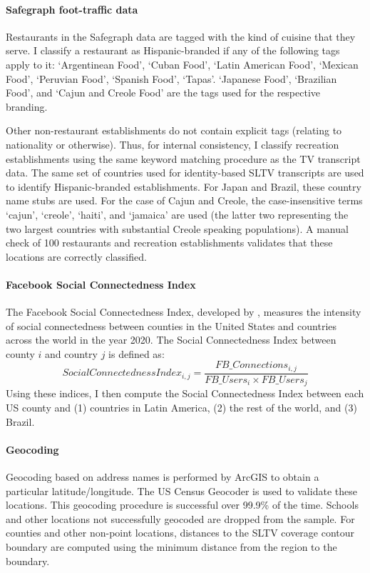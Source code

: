 \documentclass[11pt]{article}
\begin{document}
\paragraph{Safegraph foot-traffic data} 
Restaurants in the Safegraph data are tagged with the kind of cuisine that they serve. I classify a restaurant as Hispanic-branded if any of the following tags apply to it: `Argentinean Food', `Cuban Food', `Latin American Food', `Mexican Food', `Peruvian Food', `Spanish Food', `Tapas'. `Japanese Food', `Brazilian Food', and `Cajun and Creole Food' are the tags used for the respective branding.

Other non-restaurant establishments do not contain explicit tags (relating to nationality or otherwise). Thus, for internal consistency, I classify recreation establishments using the same keyword matching procedure as the TV transcript data. The same set of countries used for identity-based SLTV transcripts are used to identify Hispanic-branded establishments. For Japan and Brazil, these country name stubs are used. For the case of Cajun and Creole, the case-insensitive terms `cajun', `creole', `haiti', and `jamaica' are used (the latter two representing the two largest countries with substantial Creole speaking populations). A manual check of 100 restaurants and recreation establishments validates that these locations are correctly classified.


\paragraph{Facebook Social Connectedness Index}
The Facebook Social Connectedness Index, developed by \cite{bailey2018social}, measures the intensity of social connectedness between counties in the United States and countries across the world in the year 2020. The Social Connectedness Index between county $i$ and country $j$ is defined as:
\[Social Connectedness Index _{i,j} = \frac{FB\_Connections_{i,j}}{FB\_Users_i \times FB\_Users_j}\]
Using these indices, I then compute the Social Connectedness Index between each US county and (1) countries in Latin America, (2) the rest of the world, and (3) Brazil. 



\paragraph{Geocoding}

Geocoding based on address names is performed by ArcGIS to obtain a particular latitude/longitude. The US Census Geocoder is used to validate these locations. This geocoding procedure is successful over 99.9\% of the time. Schools and other locations not successfully geocoded are dropped from the sample. For counties and other non-point locations, distances to the SLTV coverage contour boundary are computed using the minimum distance from the region to the boundary.
\end{document}
